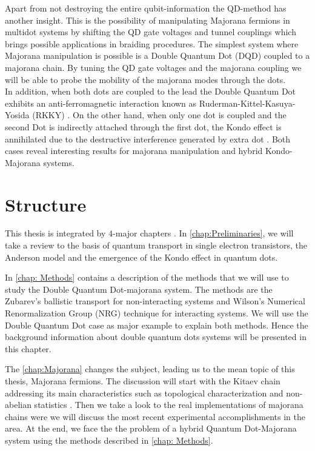  Apart from not destroying the entire qubit-information the QD-method has another insight.  This is the possibility of manipulating  Majorana fermions  in multidot systems by shifting the QD gate voltages and tunnel couplings which brings possible applications in  braiding procedures. The simplest system where Majorana manipulation is possible is  a  Double Quantum Dot (DQD) coupled to a majorana chain. By tuning the QD gate voltages and the majorana coupling we will be able to probe the mobility of the majorana modes through the dots. \\
 
In addition, when both dots are coupled to the lead the Double Quantum Dot exhibits an anti-ferromagnetic interaction known as  Ruderman-Kittel-Kasuya-Yosida (RKKY) \cite{ruderman_indirect_1954,kasuya_theory_1956,yosida_magnetic_1957}. On the other hand, when only one dot is coupled  and the second Dot is indirectly attached through the first dot,  the Kondo effect is annihilated due to the destructive interference  generated by extra dot \cite{dias_da_silva_transmission_2008}. Both cases reveal interesting results for majorana manipulation and hybrid Kondo-Majorana systems.


\section{Structure}

This thesis is integrated by $4$-major chapters . In  \ref{chap:Preliminaries}, we will take a review to the basis of quantum transport in single electron transistors, the Anderson model and the emergence of the Kondo effect in quantum dots. 

In \ref{chap: Methods} contains a description of the methods that we will use to study the Double Quantum Dot-majorana system. The  methods  are the Zubarev's ballistic transport\cite{zubarev_double-time_1960} for non-interacting systems and Wilson's Numerical Renormalization
Group (NRG) technique \citep{wilson_renormalization_1975} for interacting systems. We will use the Double Quantum Dot case as major example to explain both methods. Hence the background information about double quantum dots systems will be presented in this chapter. 

The \ref{chap:Majorana} changes the subject, leading us to the mean topic of this thesis, Majorana fermions. The discussion will start with the Kitaev chain addressing its main characteristics such as topological characterization and non-abelian statistics . Then we take a look to the real implementations of majorana chains were we will discuss the most recent experimental accomplishments  in the area.  At the end, we face the the problem of a hybrid Quantum Dot-Majorana system using the methods described in \ref{chap: Methods}.

